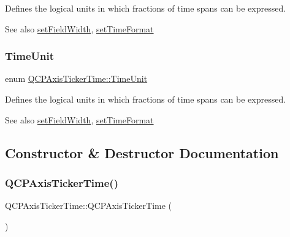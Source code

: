 Defines the logical units in which fractions of time spans can be expressed.

\begin{DoxySeeAlso}{See also}
\hyperlink{class_q_c_p_axis_ticker_time_adc13e54fc969be98a5c0e3fa0dbaa293}{set\+Field\+Width}, \hyperlink{class_q_c_p_axis_ticker_time_a2f30b6e5125bce4256be9ce3177088ea}{set\+Time\+Format} 
\end{DoxySeeAlso}
\mbox{\label{class_q_c_p_axis_ticker_time_a5c48ded8c6d3a1aca9b68219469fea3e}} 
\subsubsection{\texorpdfstring{Time\+Unit}{TimeUnit}\hspace{0.1cm}{\footnotesize\ttfamily [2/2]}}
{\footnotesize\ttfamily enum \hyperlink{class_q_c_p_axis_ticker_time_a5c48ded8c6d3a1aca9b68219469fea3e}{Q\+C\+P\+Axis\+Ticker\+Time\+::\+Time\+Unit}}

Defines the logical units in which fractions of time spans can be expressed.

\begin{DoxySeeAlso}{See also}
\hyperlink{class_q_c_p_axis_ticker_time_adc13e54fc969be98a5c0e3fa0dbaa293}{set\+Field\+Width}, \hyperlink{class_q_c_p_axis_ticker_time_a2f30b6e5125bce4256be9ce3177088ea}{set\+Time\+Format} 
\end{DoxySeeAlso}


\subsection{Constructor \& Destructor Documentation}
\mbox{\label{class_q_c_p_axis_ticker_time_a5145aac1d2117fdac411d9e8552cc41b}} 
\subsubsection{\texorpdfstring{Q\+C\+P\+Axis\+Ticker\+Time()}{QCPAxisTickerTime()}}
{\footnotesize\ttfamily Q\+C\+P\+Axis\+Ticker\+Time\+::\+Q\+C\+P\+Axis\+Ticker\+Time (\begin{DoxyParamCaption}{ }\end{DoxyParamCaption})}

